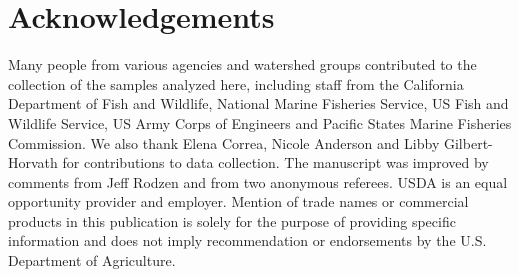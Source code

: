 \section*{Acknowledgements}
Many people from various agencies and watershed groups contributed to the collection
of the samples analyzed here, including staff from the California Department of Fish and Wildlife,
National Marine Fisheries Service, US Fish and Wildlife Service, US Army Corps of Engineers and 
Pacific States Marine Fisheries Commission. We also thank Elena Correa, Nicole Anderson and Libby
Gilbert-Horvath for contributions to data collection. The manuscript was improved by comments from
Jeff Rodzen and from two anonymous referees. USDA is an equal opportunity provider and employer. Mention of trade names
or commercial products in this publication is solely for the purpose of providing specific
information and does not imply recommendation or endorsements by the U.S. Department of Agriculture.